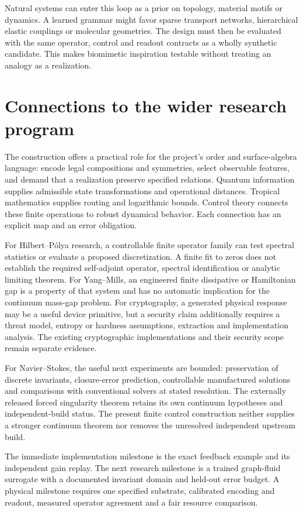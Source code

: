 Natural systems can enter this loop as a prior on topology, material motifs
or dynamics. A learned grammar might favor sparse transport networks,
hierarchical elastic couplings or molecular geometries. The design must
then be evaluated with the same operator, control and readout contracts
as a wholly synthetic candidate. This makes biomimetic inspiration
testable without treating an analogy as a realization.

\section{Connections to the wider research program}

The construction offers a practical role for the project's order and
surface-algebra language: encode legal compositions and symmetries, select
observable features, and demand that a realization preserve specified
relations. Quantum information supplies admissible state transformations
and operational distances. Tropical mathematics supplies routing and
logarithmic bounds. Control theory connects these finite operations to
robust dynamical behavior. Each connection has an explicit map and an
error obligation.

For Hilbert--P\'olya research, a controllable finite operator family can
test spectral statistics or evaluate a proposed discretization. A finite
fit to zeros does not establish the required self-adjoint operator,
spectral identification or analytic limiting theorem. For Yang--Mills,
an engineered finite dissipative or Hamiltonian gap is a property of that
system and has no automatic implication for the continuum mass-gap
problem. For cryptography, a generated physical response may be a useful
device primitive, but a security claim additionally requires a threat
model, entropy or hardness assumptions, extraction and implementation
analysis. The existing cryptographic implementations and their security
scope remain separate evidence.

For Navier--Stokes, the useful next experiments are bounded: preservation
of discrete invariants, closure-error prediction, controllable manufactured
solutions and comparisons with conventional solvers at stated resolution.
The externally released forced singularity theorem retains its own
continuum hypotheses and independent-build status. The present finite
control construction neither supplies a stronger continuum theorem nor
removes the unresolved independent upstream build.

The immediate implementation milestone is the exact feedback example and
its independent gain replay. The next research milestone is a trained
graph-fluid surrogate with a documented invariant domain and held-out
error budget. A physical milestone requires one specified substrate,
calibrated encoding and readout, measured operator agreement and a fair
resource comparison.
